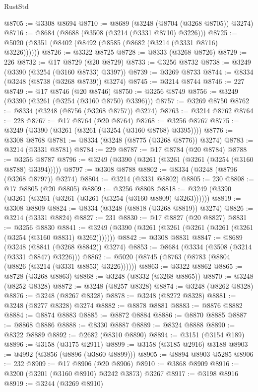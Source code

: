 \begin{lexlean}{RustStd}
\begin{coremodule}
@8705 := @3308 @8694
@8710 := @8689 (@3248 (@8704 (@3268 @8705)) @3274)
@8716 := @8684 (@8688 (@3508 (@3214 (@3331 @8710) @3226)))
@8725 := @5020 (@8351 (@8402 (@8492 (@8585 (@8682 (@3214 (@3331 @8716) @3226))))))
@8726 := @3322 @8725
@8728 := @8333 (@3268 @8726)
@8729 := 226
@8732 := @17 @8729 (@20 @8729)
@8733 := @3256 @8732
@8738 := @3249 (@3390 (@3254 (@3160 @8733) @3397))
@8739 := @3269 @8733
@8744 := @8334 (@3248 (@8738 (@3268 @8739)) @3274)
@8745 := @3214 @8744
@8746 := 227
@8749 := @17 @8746 (@20 @8746)
@8750 := @3256 @8749
@8756 := @3249 (@3390 (@3261 (@3254 (@3160 @8750) @3396)))
@8757 := @3269 @8750
@8762 := @8334 (@3248 (@8756 (@3268 @8757)) @3274)
@8763 := @3214 @8762
@8764 := 228
@8767 := @17 @8764 (@20 @8764)
@8768 := @3256 @8767
@8775 := @3249 (@3390 (@3261 (@3261 (@3254 (@3160 @8768) @3395))))
@8776 := @3308 @8768
@8781 := @8334 (@3248 (@8775 (@3268 @8776)) @3274)
@8783 := @3214 (@3331 @8781)
@8784 := 229
@8787 := @17 @8784 (@20 @8784)
@8788 := @3256 @8787
@8796 := @3249 (@3390 (@3261 (@3261 (@3261 (@3254 (@3160 @8788) @3394)))))
@8797 := @3308 @8788
@8802 := @8334 (@3248 (@8796 (@3268 @8797)) @3274)
@8804 := @3214 (@3331 @8802)
@8805 := 230
@8808 := @17 @8805 (@20 @8805)
@8809 := @3256 @8808
@8818 := @3249 (@3390 (@3261 (@3261 (@3261 (@3261 (@3254 (@3160 @8809) @3263))))))
@8819 := @3308 @8809
@8824 := @8334 (@3248 (@8818 (@3268 @8819)) @3274)
@8826 := @3214 (@3331 @8824)
@8827 := 231
@8830 := @17 @8827 (@20 @8827)
@8831 := @3256 @8830
@8841 := @3249 (@3390 (@3261 (@3261 (@3261 (@3261 (@3261 (@3254 (@3160 @8831) @3262)))))))
@8842 := @3308 @8831
@8847 := @8689 (@3248 (@8841 (@3268 @8842)) @3274)
@8853 := @8684 (@3334 (@3508 (@3214 (@3331 @8847) @3226)))
@8862 := @5020 (@8745 (@8763 (@8783 (@8804 (@8826 (@3214 (@3331 @8853) @3226))))))
@8863 := @3322 @8862
@8865 := @8728 (@3268 @8863)
@8868 := @3248 (@8332 (@3268 @8865))
@8870 := @3248 (@8252 @8328)
@8872 := @3248 (@8257 @8328)
@8874 := @3248 (@8262 @8328)
@8876 := @3248 (@8267 @8328)
@8878 := @3248 (@8272 @8328)
@8881 := @3248 (@8277 @8328) @3274
@8882 := @8878 @8881
@8883 := @8876 @8882
@8884 := @8874 @8883
@8885 := @8872 @8884
@8886 := @8870 @8885
@8887 := @8868 @8886
@8888 := @8330 @8887
@8889 := @8324 @8888
@8890 := @8322 @8889
@8892 := @2682 (@8310 @8890)
@8894 := @3151 (@3154 @189)
@8896 := @3158 (@3175 @2911)
@8899 := @3158 (@3185 @2916) @3188
@8903 := @4992 (@3856 (@8896 (@3860 @8899)))
@8905 := @8894 @8903 @5285
@8906 := 232
@8909 := @17 @8906 (@20 @8906)
@8910 := @3868 @8909
@8916 := @3200 (@3201 (@3160 @8910) @3242 @3873) @3267
@8917 := @3198 @8916
@8919 := @3244 (@3269 @8910)

\end{coremodule}
\end{lexlean}
